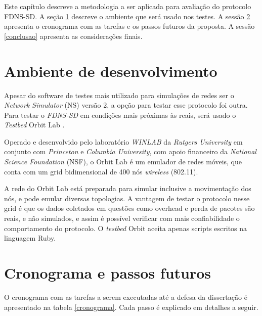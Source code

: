 
Este capítulo descreve a metodologia a ser aplicada para avaliação do protocolo
FDNS-SD. A seção \ref{ambiente} descreve o ambiente que será usado nos testes.
A sessão \ref{futuro} apresenta o cronograma com as tarefas e os passos futuros
da proposta. A sessão \ref{conclusao} apresenta as considerações finais.

\section{Ambiente de desenvolvimento}
\label{ambiente}

    Apesar do software de testes mais utilizado para simulações de redes ser o
    \textit{Network Simulator} (NS) versão 2, a opção para testar esse protocolo
    foi outra. Para testar o \textit{FDNS-SD} em condições mais próximas às reais,
    será usado o \textit{Testbed} Orbit Lab \cite{orbit}.
    
    Operado e desenvolvido pelo laboratório \textit{WINLAB} \cite{winlab} da
    \textit{Rutgers University} em conjunto com \textit{Princeton} e
    \textit{Columbia University}, com apoio financeiro da \textit{National
    Science Foundation} (NSF), o Orbit Lab é um emulador de redes móveis, que
    conta com um grid bidimensional de 400 nós \textit{wireless} (802.11).

    A rede do Orbit Lab está preparada para simular inclusive a movimentação dos nós,
    e pode emular diversas topologias. A vantagem de testar o protocolo nesse grid é
    que os dados coletados em questões como overhead e perda de pacotes são reais, e
    não simulados, e assim é possível verificar com mais confiabilidade o comportamento
    do protocolo. O \textit{testbed} Orbit aceita apenas scripts escritos na linguagem
    Ruby.

\section{Cronograma e passos futuros}
\label{futuro}

    O cronograma com as tarefas a serem executadas até a defesa da dissertação
    é apresentado na tabela \ref{cronograma}. Cada passo é explicado em detalhes
    a seguir.
    
